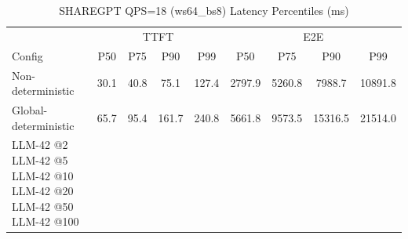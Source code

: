 \begin{table}[htbp]
\centering
\caption{SHAREGPT QPS=18 (ws64_bs8) Latency Percentiles (ms)}
\label{tab:sharegpt_qps18_ws64_bs8}
\begin{tabular}{l|cccc|cccc}
\toprule
& \multicolumn{4}{c|}{TTFT} & \multicolumn{4}{c}{E2E} \\
Config & P50 & P75 & P90 & P99 & P50 & P75 & P90 & P99 \\
\midrule
Non-deterministic & 30.1 & 40.8 & 75.1 & 127.4 & 2797.9 & 5260.8 & 7988.7 & 10891.8 \\
Global-deterministic & 65.7 & 95.4 & 161.7 & 240.8 & 5661.8 & 9573.5 & 15316.5 & 21514.0 \\
LLM-42 @2%
LLM-42 @5%
LLM-42 @10%
LLM-42 @20%
LLM-42 @50%
LLM-42 @100%
\bottomrule
\end{tabular}
\end{table}
